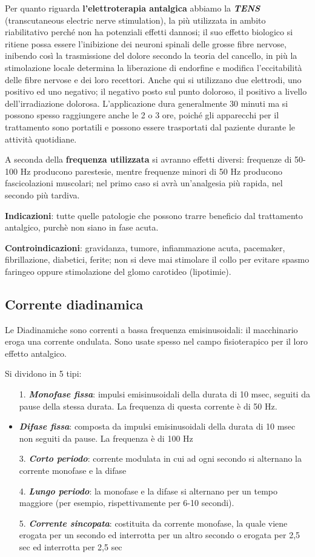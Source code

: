 Per quanto riguarda \textbf{l'elettroterapia antalgica} abbiamo la \textbf{\emph{TENS}} (transcutaneous electric nerve stimulation), la più utilizzata in ambito riabilitativo perché non ha potenziali effetti dannosi; il suo effetto biologico si ritiene possa essere l'inibizione dei neuroni spinali delle grosse fibre nervose, inibendo così la trasmissione del dolore secondo la teoria del cancello, in più la stimolazione locale determina la liberazione di endorfine e modifica
l'eccitabilità delle fibre nervose e dei loro recettori. Anche qui si utilizzano due elettrodi, uno positivo ed uno negativo; il negativo posto sul punto doloroso, il positivo a livello dell'irradiazione dolorosa. L'applicazione dura generalmente 30 minuti ma si possono
spesso raggiungere anche le 2 o 3 ore, poiché gli apparecchi per il trattamento sono portatili e possono essere trasportati dal paziente durante le attività quotidiane.

A seconda della \textbf{frequenza utilizzata} si avranno effetti diversi: frequenze di 50-100 Hz producono parestesie, mentre frequenze minori di 50 Hz producono fascicolazioni muscolari; nel primo caso si avrà un'analgesia più rapida, nel secondo più tardiva.

\textbf{Indicazioni}: tutte quelle patologie che possono trarre beneficio dal trattamento antalgico, purchè non siano in fase acuta.

\textbf{Controindicazioni}: gravidanza, tumore, infiammazione acuta, pacemaker, fibrillazione, diabetici, ferite; non si deve mai stimolare il collo per evitare spasmo faringeo oppure stimolazione del glomo carotideo (lipotimie).


\subsection{Corrente diadinamica}

Le Diadinamiche sono correnti a bassa frequenza emisinusoidali: il macchinario eroga una corrente ondulata. Sono usate spesso nel campo
fisioterapico per il loro effetto antalgico.

Si dividono in 5 tipi:

\begin{itemize}
\item[1.]
  \textbf{\emph{Monofase fissa}}: impulsi emisinusoidali della durata di 10 msec, seguiti da pause della stessa durata. La frequenza di questa corrente è di 50 Hz.
\item
  \textbf{\emph{Difase fissa}}: composta da impulsi emisinusoidali della durata di 10 msec non seguiti da pause. La frequenza è di 100 Hz
\item[3.]
  \textbf{\emph{Corto periodo}}: corrente modulata in cui ad ogni secondo si alternano la corrente monofase e la difase
\item[4.]
  \textbf{\emph{Lungo periodo}}: la monofase e la difase si alternano per un tempo maggiore (per esempio, rispettivamente per 6-10 secondi).
\item[5.]
  \textbf{\emph{Corrente sincopata}}: costituita da corrente monofase, la quale viene erogata per un secondo ed interrotta per un altro secondo o erogata per 2,5 sec ed interrotta per 2,5 sec
\end{itemize}

